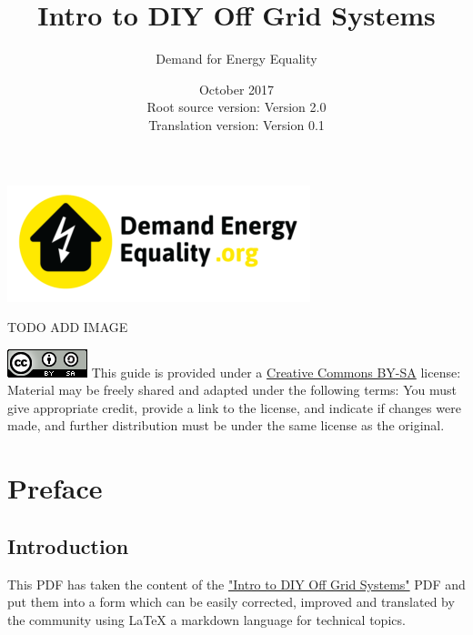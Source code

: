 \documentclass{article}
\title{Intro to DIY Off Grid Systems}
\author{Demand for Energy Equality}
\date{October 2017 \\ Root source version: Version 2.0 \\ Translation version: Version 0.1}
\theoremstyle{definition}
\theoremstyle{definition}
\theoremstyle{remark}
\begin{document}
 
\maketitle{}

\begin{center}
  \includegraphics[width=0.25\paperwidth]{../Images/image_0_0_(demand_energy_equality).png}
\end{center}

TODO ADD IMAGE

\vfill
  
\includegraphics[]{../Images/image_0_2_(license).png} \newline
This guide is provided under a \href{https://creativecommons.org/licenses/by-sa/4.0/legalcode}{Creative Commons BY-SA} license: \newline
Material may be freely shared and adapted under the following terms: You must give appropriate credit, provide a link to the license, and indicate if changes were made, and further distribution must be under the same license as the original.

\newpage

\tableofcontents

\newpage

\section{Preface} %
\label{sec:preface}

  \subsection*{Introduction} %
  \label{sub:introduction}
  
    This PDF has taken the content of the \href{https://www.demandenergyequality.org/get-started-with-offgrid}{"Intro to DIY Off Grid Systems"} PDF and put them into a form which can be easily corrected, improved and translated by the community using LaTeX a markdown language for technical topics.
\end{document}
